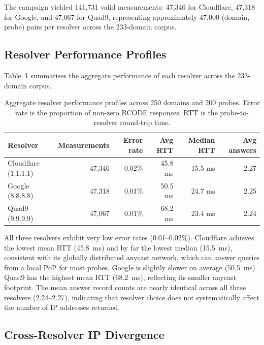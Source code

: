 The campaign yielded 141,731 valid measurements: 47,346 for Cloudflare, 47,318 for Google, and 47,067 for Quad9, representing approximately 47,000 (domain, probe) pairs per resolver across the 233-domain corpus.

\subsection{Resolver Performance Profiles}
\label{subsec:4.5.2}

Table~\ref{tab:4.4} summarises the aggregate performance of each resolver across the 233-domain corpus.

\begin{table}[H]
\centering
\small
\begin{tabular}{l r r r r r}
\toprule
\textbf{Resolver} & \textbf{Measurements} & \textbf{Error rate} & \textbf{Avg \ac{RTT}} & \textbf{Median \ac{RTT}} & \textbf{Avg answers} \\
\midrule
Cloudflare (1.1.1.1) & 47,346 & 0.02\% & 45.8 ms & 15.5 ms & 2.27 \\
Google (8.8.8.8)     & 47,318 & 0.01\% & 50.5 ms & 24.7 ms & 2.25 \\
Quad9 (9.9.9.9)      & 47,067 & 0.01\% & 68.2 ms & 23.4 ms & 2.24 \\
\bottomrule
\end{tabular}
\caption{Aggregate resolver performance profiles across 250 domains and 200 probes. Error rate is the proportion of non-zero RCODE responses. \ac{RTT} is the probe-to-resolver round-trip time.}
\label{tab:4.4}
\end{table}

All three resolvers exhibit very low error rates (0.01--0.02\%). Cloudflare achieves the lowest mean \ac{RTT} (45.8~ms) and by far the lowest median (15.5~ms), consistent with its globally distributed anycast network, which can answer queries from a local \ac{PoP} for most probes. Google is slightly slower on average (50.5~ms). Quad9 has the highest mean \ac{RTT} (68.2~ms), reflecting its smaller anycast footprint. The mean answer record counts are nearly identical across all three resolvers (2.24--2.27), indicating that resolver choice does not systematically affect the number of \ac{IP} addresses returned.

\subsection{Cross-Resolver IP Divergence}
\label{subsec:4.5.3}


